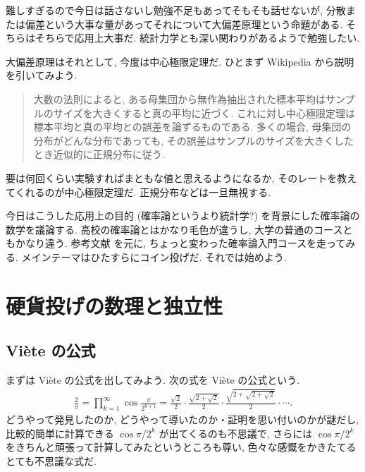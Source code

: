 \documentclass[openany, a4paper, oneside]{book}
\theoremstyle{break}
\theoremstyle{breakdefn}
\begin{document}
難しすぎるので今日は話さないし勉強不足もあってそもそも話せないが,
分散または偏差という大事な量があってそれについて大偏差原理という命題がある.
そちらはそちらで応用上大事だ.
統計力学とも深い関わりがあるようで勉強したい.

大偏差原理はそれとして, 今度は中心極限定理だ.
ひとまず Wikipedia から説明を引いてみよう.
\begin{quote}
大数の法則によると, ある母集団から無作為抽出された標本平均はサンプルのサイズを大きくすると真の平均に近づく.
これに対し中心極限定理は標本平均と真の平均との誤差を論ずるものである.
多くの場合, 母集団の分布がどんな分布であっても, その誤差はサンプルのサイズを大きくしたとき近似的に正規分布に従う.
\end{quote}

要は何回くらい実験すればまともな値と思えるようになるか, そのレートを教えてくれるのが中心極限定理だ.
正規分布などは一旦無視する.

今日はこうした応用上の目的 (確率論というより統計学?) を背景にした確率論の数学を議論する.
高校の確率論とはかなり毛色が違うし, 大学の普通のコースともかなり違う.
参考文献 \cite{MarkKac1} を元に, ちょっと変わった確率論入門コースを走ってみる.
メインテーマはひたすらにコイン投げだ.
それでは始めよう.
\section{硬貨投げの数理と独立性}
\label{sec-8-1-4}
\subsection{Vi\`ete の公式 \label{Hinashiro_math_party_1_probability_15}}
\label{sec-8-1-4-1}

まずは Vi\`ete の公式を出してみよう.
次の式を Vi\`ete の公式という.
\begin{align}
 \frac{2}{\pi}
 =
 \prod_{k=1}^{\infty} \cos \frac{\pi}{2^{k+1}}
 =
 \frac{\sqrt{2}}{2} \cdot \frac{\sqrt{2 + \sqrt{2}}}{2} \cdot \frac{\sqrt{2 + \sqrt{2 + \sqrt{2}}}}{2} \cdot \cdots.
\end{align}
どうやって発見したのか, どうやって導いたのか・証明を思い付いのかが謎だし,
比較的簡単に計算できる $\cos \pi/2^k$ が出てくるのも不思議で,
さらには $\cos \pi / 2^k$ をきちんと頑張って計算してみたというところも尊い,
色々な感慨をかきたてるとても不思議な式だ.
\end{document}
